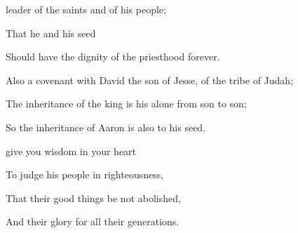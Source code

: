 {\par }{ leader of the
 saints and of his people;
\par }{\Q That he and his seed
\par }{\Q Should have the dignity of the priesthood forever.
\par }{\Q {}Also
{} a covenant with David the son of Jesse, of the tribe of Judah;
\par }{\Q The inheritance of the king is his alone from son to son;
\par }{\Q So the inheritance of Aaron is also to his seed.
\par }{\Q {} give you wisdom in your heart
\par }{\Q To judge his people in righteousness,
\par }{\Q That their good things be not abolished,
\par }{\Q And
{} their glory
{} for all their generations.
\par }{\BB \par }
